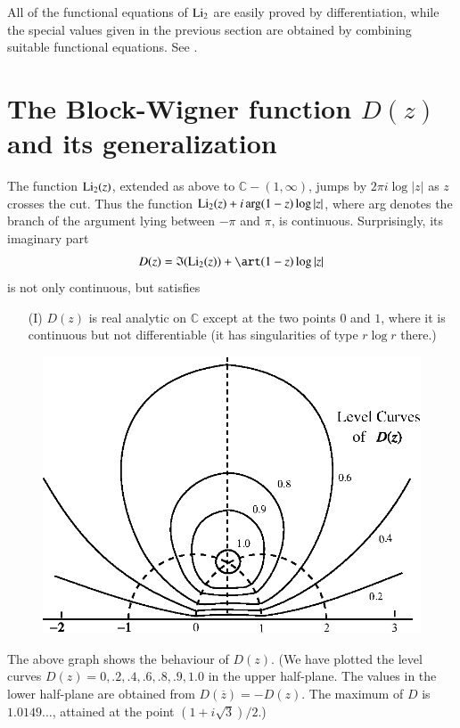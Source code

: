 All of the functional equations of $\operatorname{Li}_{2}$ are easily proved by differentiation, while the special values given in the previous section are obtained by combining suitable functional equations. See \cite{art15-key4}.

\section{The Block-Wigner function \texorpdfstring{$D(z)$}{Dz} and its generalization}\label{art15-sec3}
The function $\operatorname{Li}_{2}(z)$, extended as above to $\mathbb{C}-(1,\infty)$, jumps by $2\pi i\log |z|$ as $z$ crosses the cut. Thus the function $\operatorname{Li}_{2}(z)+i\arg (1-z)\log |z|$, where arg denotes the branch of the argument lying between $-\pi$ and $\pi$, is continuous. Surprisingly, its imaginary part
$$
D(z)=\mathfrak{I}(\Li_{2}(z))+\art(1-z)\log |z|
$$
is not only continuous, but satisfies
\begin{itemize}
\item[(I)] $D(z)$ is real analytic on $\mathbb{C}$ except at the two points $0$ and $1$, where it is continuous but not differentiable (it has singularities of type $r\log r$ there.)
\end{itemize}
\begin{figure}[H]
\centering
\includegraphics{figures/fig3.eps}
\end{figure}\pageoriginale

The above graph shows the behaviour of $D(z)$. (We have plotted the level curves $D(z)=0,.2,.4,.6,.8,.9,1.0$ in the upper half-plane. The values in the lower half-plane are obtained from $D(\overline{z})=-D(z)$. The maximum of $D$ is $1.0149\ldots$, attained at the point $(1+i\sqrt{3})/2$.)

